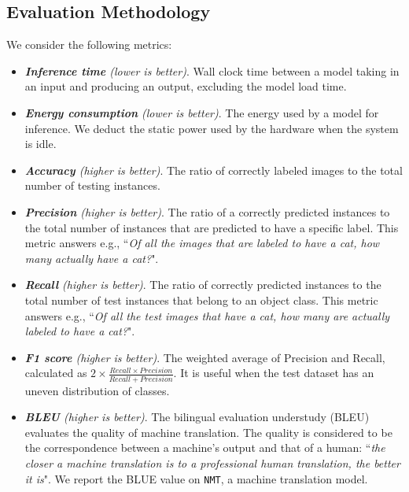 \subsection{Evaluation Methodology \label{sec:method}}

 We consider the following metrics:
\begin{itemize}
\item \emph{\textbf{Inference time} (lower is better)}. Wall clock time between a model taking in an input and producing an output,
    excluding the model load time.

\item \emph{\textbf{Energy consumption} (lower is better)}. The energy used by a model for inference.  We deduct the static power used by
    the hardware when the system is idle.

\item \emph{\textbf{Accuracy} (higher is better)}. The ratio of correctly labeled images to the total number of testing instances.

\item \emph{\textbf{Precision} (higher is better)}. The ratio of a correctly predicted instances to the total number of instances that
    are predicted to have a specific label. This metric answers e.g., ``\emph{Of all the images that are labeled to have a cat, how many
    actually have a cat?}".

\item \emph{\textbf{Recall} (higher is better)}. The ratio of correctly predicted instances to the total number of test instances that
    belong to an object class. This metric answers e.g., ``\emph{Of all the test images that have a cat, how many are actually labeled to
    have a cat?}".

\item \emph{\textbf{F1 score} (higher is better)}.  The weighted average of Precision and Recall, calculated as $2\times\frac{Recall
    \times Precision} {Recall + Precision}$. It is useful when the test dataset has an uneven distribution of classes.

\item \emph{\textbf{BLEU} (higher is better)}. The bilingual evaluation understudy (BLEU) evaluates the quality of machine translation.
    The quality is considered to be the correspondence between a machine's output and that of a human: ``\emph{the closer a machine
    translation is to a professional human translation, the better it is}". We report the BLUE value on \texttt{NMT}, a machine
    translation model.


\end{itemize}

